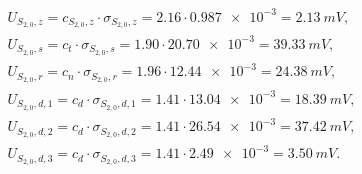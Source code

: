 \begin{gather}
U_{S_{2,0},z} = c_{S_{2,0},z} \cdot \sigma_{S_{2,0},z} = 2.16 \cdot \num{0.987e-3} = \qty{2.13}{mV} \label{eq:sym_partd_output_unc_roun_S_2_0},\\
U_{S_{2,0},s} = c_{t} \cdot \sigma_{S_{2,0},s} = 1.90 \cdot \num{20.70e-3} = \qty{39.33}{mV} \label{eq:sym_partd_output_unc_stat_S_2_0}, \\
U_{S_{2,0},r} = c_{n} \cdot \sigma_{S_{2,0},r} = 1.96 \cdot \num{12.44e-3} = \qty{24.38}{mV} \label{eq:sym_partd_output_unc_rand_S_2_0}, \\
U_{S_{2,0},d,1} = c_{d} \cdot \sigma_{S_{2,0},d,1} = 1.41 \cdot \num{13.04e-3} = \qty{18.39}{mV} \label{eq:sym_partd_output_unc_dyn_1_S_2_0}, \\
U_{S_{2,0},d,2} = c_{d} \cdot \sigma_{S_{2,0},d,2} = 1.41 \cdot \num{26.54e-3} = \qty{37.42}{mV} \label{eq:sym_partd_output_unc_dyn_2_S_2_0}, \\
U_{S_{2,0},d,3} = c_{d} \cdot \sigma_{S_{2,0},d,3} = 1.41 \cdot \num{2.49e-3} = \qty{3.50}{mV} \label{eq:sym_partd_output_unc_dyn_3_S_2_0}.
\end{gather}

